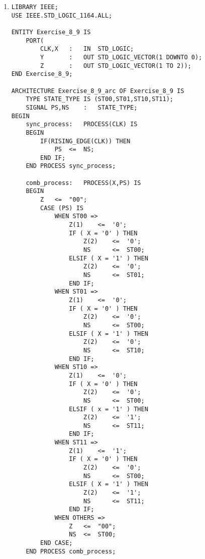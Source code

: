 \begin{enumerate}
\begin{lstlisting}
	comb_process:	PROCESS(X,PS) IS
	BEGIN
		Z	<=	"00";
		CASE (PS) IS
			WHEN ST000 =>
				Z	<=	"00";
				IF ( X = '0' ) THEN
					NS	<=	ST000;
				ELSIF ( X = '1' ) THEN
					NS	<=	ST001;
				END IF;
			WHEN ST001 =>
				Z	<=	"00";
				IF ( X = '0' ) THEN
					NS	<=	ST001;
				ELSIF ( X = '1' ) THEN
					NS	<=	ST010;
				END IF;
			WHEN ST010 =>
				Z	<=	"00";
				IF ( X = '0' ) THEN
					NS	<=	ST010;
				ELSIF ( X = '1' ) THEN
					NS	<=	ST011;
				END IF;
			WHEN ST011 =>
				Z	<=	"10";
				IF ( X = '0' ) THEN
					NS	<=	ST011;
				ELSIF ( X = '1' ) THEN
					NS	<= ST100;
				END IF;
			WHEN ST100 =>
				Z	<=	"01";
				If ( X = '0' ) THEN
					NS	<=	ST000;
				ELSIF ( X = '1' ) THEN
					NS	<=	ST101;
				END IF;
			WHEN ST101 =>
				Z	<=	"11";
				IF ( X = '0' ) THEN
					NS	<=	ST101;
				ELSIF ( X = '1' ) THEN
					NS	<=	ST110;
				END IF;
			WHEN ST110 =>
				Z	<=	"11";
				IF ( X = '0' ) THEN
					NS	<=	ST110;
				ELSIF ( X = '1' ) THEN
					NS	<=	ST111;
				END IF;
			WHEN ST111 =>
				Z	<=	"11";
				IF ( X = '0' ) THEN
					NS	<=	ST111;
				ELSIF ( X = '1' ) THEN
					NS	<=	ST000;
				END IF;
			WHEN OTHERS =>
				Z	<=	"00";
				NS	<=	ST000;
		END CASE;
	END PROCESS comb_process;
	
		WITH PS SELECT
		Y	<=	"000" WHEN ST000,
				"001" WHEN ST001,
				"010" WHEN ST010,
				"011" WHEN ST011,
				"100" WHEN ST100,
				"101" WHEN ST101,
				"110" WHEN ST110,
				"111" WHEN ST111,
				"000" WHEN OTHERS;
END Exercise_8_8_arc;
	\end{lstlisting}
	
	\item \begin{lstlisting}
LIBRARY IEEE;
USE IEEE.STD_LOGIC_1164.ALL;

ENTITY Exercise_8_9 IS
	PORT(
		CLK,X	:	IN	STD_LOGIC;
		Y		:	OUT	STD_LOGIC_VECTOR(1 DOWNTO 0);
		Z		:	OUT	STD_LOGIC_VECTOR(1 TO 2));
END Exercise_8_9;

ARCHITECTURE Exercise_8_9_arc OF Exercise_8_9 IS
	TYPE STATE_TYPE IS (ST00,ST01,ST10,ST11);
	SIGNAL PS,NS	:	STATE_TYPE;
BEGIN
	sync_process:	PROCESS(CLK) IS
	BEGIN
		IF(RISING_EDGE(CLK)) THEN
			PS	<=	NS;
		END IF;
	END PROCESS sync_process;
	
	comb_process:	PROCESS(X,PS) IS
	BEGIN
		Z	<=	"00";
		CASE (PS) IS
			WHEN ST00 =>
				Z(1)	<=	'0';
				IF ( X = '0' ) THEN
					Z(2)	<=	'0';
					NS		<=	ST00;
				ELSIF ( X = '1' ) THEN
					Z(2)	<=	'0';
					NS		<=	ST01;
				END IF;
			WHEN ST01 =>
				Z(1)	<=	'0';
				IF ( X = '0' ) THEN
					Z(2)	<=	'0';
					NS		<=	ST00;
				ELSIF ( X = '1' ) THEN
					Z(2)	<=	'0';
					NS		<=	ST10;
				END IF;
			WHEN ST10 =>
				Z(1)	<=	'0';
				IF ( X = '0' ) THEN
					Z(2)	<=	'0';
					NS		<=	ST00;
				ELSIF ( x = '1' ) THEN
					Z(2)	<=	'1';
					NS		<=	ST11;
				END IF;
			WHEN ST11 =>
				Z(1)	<=	'1';
				IF ( X = '0' ) THEN
					Z(2)	<=	'0';
					NS		<=	ST00;
				ELSIF ( X = '1' ) THEN
					Z(2)	<=	'1';
					NS		<=	ST11;
				END IF;
			WHEN OTHERS =>
				Z	<=	"00";
				NS	<=	ST00;
		END CASE;
	END PROCESS comb_process;
	

\end{lstlisting}
\end{enumerate}
